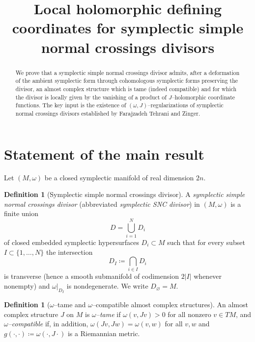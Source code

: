 \documentclass[11pt]{article}
\theoremstyle{definition}
\newtheorem{definition}[theorem]{Definition}
\begin{document}
\title{Local holomorphic defining coordinates for symplectic simple normal crossings divisors}
\author{}
\date{}
\maketitle

\begin{abstract}
We prove that a symplectic simple normal crossings divisor admits, after a deformation of the ambient symplectic form through cohomologous symplectic forms preserving the divisor, an almost complex structure which is tame (indeed compatible) and for which the divisor is locally given by the vanishing of a product of $J$--holomorphic coordinate functions.
The key input is the existence of $(\omega,J)$--regularizations of symplectic normal crossings divisors established by Farajzadeh Tehrani and Zinger.
\end{abstract}

\section{Statement of the main result}

Let $(M,\omega)$ be a closed symplectic manifold of real dimension $2n$.

\begin{definition}[Symplectic simple normal crossings divisor]\label{def:scdiv}
A \emph{symplectic simple normal crossings divisor} (abbreviated \emph{symplectic SNC divisor}) in $(M,\omega)$ is a finite union
\[
D=\bigcup_{i=1}^N D_i
\]
of closed embedded symplectic hypersurfaces $D_i\subset M$ such that for every subset $I\subset\{1,\dots,N\}$ the intersection
\[
D_I \coloneqq \bigcap_{i\in I} D_i
\]
is transverse (hence a smooth submanifold of codimension $2|I|$ whenever nonempty) and $\omega|_{D_I}$ is nondegenerate.  We write $D_\varnothing=M$.
\end{definition}

\begin{definition}[$\omega$--tame and $\omega$--compatible almost complex structures]
An almost complex structure $J$ on $M$ is \emph{$\omega$--tame} if $\omega(v,Jv)>0$ for all nonzero $v\in TM$, and \emph{$\omega$--compatible} if, in addition, $\omega(Jv,Jw)=\omega(v,w)$ for all $v,w$ and $g(\cdot,\cdot)\coloneqq \omega(\cdot,J\cdot)$ is a Riemannian metric.
\end{definition}
\end{document}
